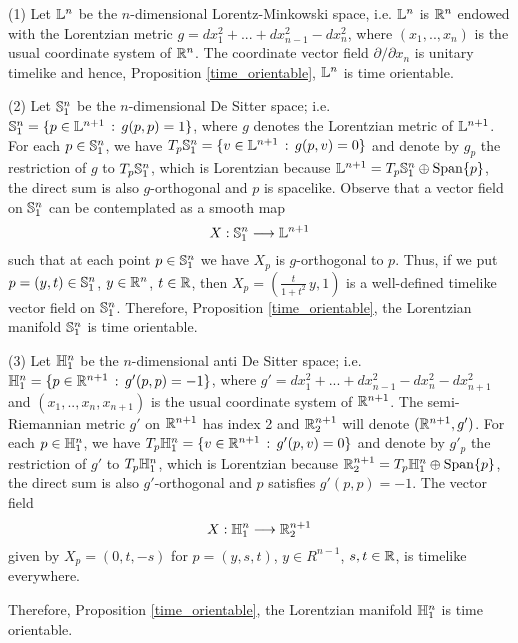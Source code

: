 \begin{example}
    (1) Let $\L^n$ be the $n$-dimensional Lorentz-Minkowski space, i.e. $\L^n$ is $\R^n$ endowed with the Lorentzian metric $g=dx_1^2+...+dx_{n-1}^2-dx_n^2$, where $(x_1,..,x_n)$ is the usual coordinate system of $\R^n$. The coordinate vector field $\partial/\partial x_n$ is unitary timelike and hence, Proposition \ref{time_orientable}, $\L ^n$ is time orientable.

    \vspace{2mm}

    \noindent (2) Let $\S_1^n$ be the $n$-dimensional De Sitter space; i.e. $\S_1^n =\{p \in \L^{n+1} \, :\, g(p,p)=1 \}$, where $g$ denotes the Lorentzian metric of $\L^{n+1}$. For each $p \in \S_1^n$, we have $T_p\S_1^n=\{v \in \L^{n+1} \, : \, g(p,v)=0\}$
    and denote by $g_p$ the restriction of $g$ to $T_p\S_1^n$, which is Lorentzian because $\L^{n+1}=T_p\S_1^n \oplus \mathrm{Span}\{p\}$, the direct sum is also $g$-orthogonal and $p$ is spacelike. Observe that a vector field on $\S_1^n$ can be contemplated as a smooth map
    \[
        X : \S_1^n \longrightarrow \L^{n+1}
    \]
    such that at each point $p \in \S_1^n$ we have $X_p$ is $g$-orthogonal to $p$. Thus, if we put $p=(y,t)\in \S_1^n$, $y \in \R^n$, $t \in \R$, then $X_p=(\frac{t}{1+t^2}\,y,1)$ is a well-defined timelike vector field on $\S_1^n$. Therefore, Proposition \ref{time_orientable}, the Lorentzian manifold $\S_1^n$ is time orientable.

    \vspace{2mm}

    \noindent (3) Let $\H_1^n$ be the $n$-dimensional anti De Sitter space; i.e. $\H_1^n =\{p \in \R^{n+1} \, :\, g'(p,p)=-1 \}$, where $g'=dx_1^2+...+dx_{n-1}^2-dx_n^2-dx_{n+1}^2$ and $(x_1,..,x_n,x_{n+1})$ is the usual coordinate system of $\R^{n+1}$. The semi-Riemannian metric $g'$ on $\R^{n+1}$ has index 2 and
    $\R^{n+1}_2$ will denote $(\R^{n+1},g')$. For each $p \in \H_1^n$, we have $T_p\H_1^n=\{v \in \R^{n+1} \, : \, g'(p,v)=0\}$ and denote by $g'_p$ the restriction of $g'$ to $T_p\H_1^n$, which is Lorentzian because $\R^{n+1}_2=T_p\H_1^n \oplus \mathrm{Span}\{p\}$,
    the direct sum is also $g'$-orthogonal and $p$ satisfies $g'(p,p)=-1$. The vector field
    \[
        X : \H_1^n \longrightarrow \R^{n+1}_2
    \]
    given by $X_p=(0,t,-s)$ for $p=(y,s,t)$, $y \in R^{n-1}$, $s,t\in \R$, is timelike everywhere.

    Therefore, Proposition \ref{time_orientable}, the Lorentzian manifold $\H_1^n$ is time orientable.
\end{example}


